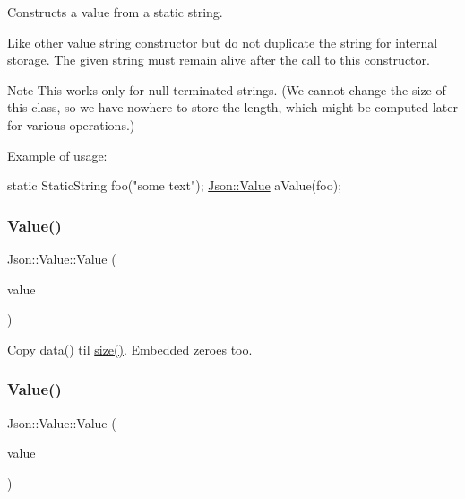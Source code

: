 Constructs a value from a static string. 

Like other value string constructor but do not duplicate the string for internal storage. The given string must remain alive after the call to this constructor. \begin{DoxyNote}{Note}
This works only for null-\/terminated strings. (We cannot change the size of this class, so we have nowhere to store the length, which might be computed later for various operations.)
\end{DoxyNote}
Example of usage\+: 
\begin{DoxyCode}
\textcolor{keyword}{static} StaticString foo(\textcolor{stringliteral}{"some text"});
\hyperlink{class_json_1_1_value}{Json::Value} aValue(foo);
\end{DoxyCode}
 \hypertarget{class_json_1_1_value_a89ef37969ff7c6eb3a7afcca03d4cd4a}{}\label{class_json_1_1_value_a89ef37969ff7c6eb3a7afcca03d4cd4a} 
\subsubsection{\texorpdfstring{Value()}{Value()}\hspace{0.1cm}{\footnotesize\ttfamily [22/24]}}
{\footnotesize\ttfamily Json\+::\+Value\+::\+Value (\begin{DoxyParamCaption}\item[{const \hyperlink{config_8h_a1e723f95759de062585bc4a8fd3fa4be}{J\+S\+O\+N\+C\+P\+P\+\_\+\+S\+T\+R\+I\+NG} \&}]{value }\end{DoxyParamCaption})}



Copy data() til \hyperlink{class_json_1_1_value_a0ec2808e1d7efa4e9fad938d6667be44}{size()}. Embedded zeroes too. 

\hypertarget{class_json_1_1_value_a350a31ea4a30d384994b0bc010b17495}{}\label{class_json_1_1_value_a350a31ea4a30d384994b0bc010b17495} 
\subsubsection{\texorpdfstring{Value()}{Value()}\hspace{0.1cm}{\footnotesize\ttfamily [23/24]}}
{\footnotesize\ttfamily Json\+::\+Value\+::\+Value (\begin{DoxyParamCaption}\item[{bool}]{value }\end{DoxyParamCaption})}

